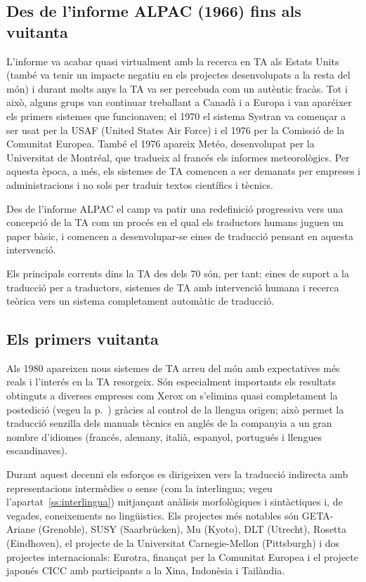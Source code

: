 \subsection{Des de l'informe ALPAC (1966) fins als vuitanta}

L'informe va acabar quasi virtualment amb la 
recerca en TA als Estats Units (també va tenir un 
impacte negatiu en els projectes desenvolupats 
a la resta del món) i durant molts anys la TA va 
ser percebuda com un autèntic fracàs. Tot i això, 
alguns grups van continuar treballant a Canadà i a Europa
i van aparéixer els primers sistemes que funcionaven; 
el 1970 el sistema Systran va començar a ser usat 
per la USAF (United States Air Force) i 
el 1976 per la Comissió de la Comunitat Europea.
També el 1976 apareix Metéo, 
desenvolupat per la Universitat de Montréal,
que tradueix al francés els informes meteorològics. 
Per aquesta època, a més, 
els sistemes de TA comencen a ser demanats per empreses 
i administracions i no sols per
traduir textos científics i tècnics.

Des de l'informe ALPAC
el camp va patir una redefinició progressiva vers una 
concepció de la TA 
com un procés en el qual els traductors humans juguen 
un paper bàsic, 
i comencen a desenvolupar-se eines de traducció 
pensant en aquesta intervenció.

Els principals corrents dins la TA des dels 70 són, per tant: 
eines de suport a la traducció per a traductors, 
sistemes de TA amb intervenció humana i recerca teòrica 
vers un sistema completament 
automàtic de traducció.

\subsection{Els primers vuitanta}

Als 1980 apareixen nous sistemes de TA arreu del món
amb expectatives més reals i l'interés en la TA
resorgeix.
Són especialment importants els resultats obtinguts a 
diverses empreses com Xerox on s'elimina 
quasi completament la postedició (vegeu la p.~\pageref{pg:homografia}) gràcies al control 
de la llengua origen; això permet la traducció 
senzilla dels manuals tècnics en anglés de la companyia 
a un gran nombre d'idiomes (francés, 
alemany, italià, espanyol, portugués i llengues escandinaves).

Durant aquest decenni els esforços es dirigeixen vers la traducció indirecta 
amb representacions 
intermèdies o sense (com la interlingua; 
vegeu l'apartat~\ref{ss:interlingua}) 
mitjançant
anàlisis morfològiques i sintàctiques i, de vegades, 
coneixements no lingüistics. 
Els projectes més notables són GETA-Ariane (Grenoble), SUSY 
(Saarbrücken), Mu (Kyoto), DLT (Utrecht), Rosetta (Eindhoven), 
el projecte de la Universitat 
Carnegie-Mellon (Pittsburgh) i dos projectes internacionals: 
Eurotra, finançat per la Comunitat 
Europea i el projecte japonés CICC amb participants 
a la Xina, Indonèsia i Tailàndia.

